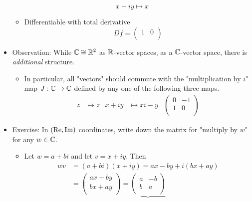\documentclass[../notes.tex]{subfiles}
\begin{document}
\begin{itemize}
\begin{equation*}
        x+iy \mapsto x
    \end{equation*}
    \begin{itemize}
        \item Differentiable with total derivative
        \begin{equation*}
            Df =
            \begin{pmatrix}
                1 & 0\\
            \end{pmatrix}
        \end{equation*}
    \end{itemize}
    \item Observation: While $\mathbb{C}\cong\mathbb{R}^2$ as $\mathbb{R}$-vector spaces, as a $\mathbb{C}$-vector space, there is \emph{additional} structure.
    \begin{itemize}
        \item In particular, all "vectors" should commute with the "multiplication by $i$" map $J:\mathbb{C}\to\mathbb{C}$ defined by any one of the following three maps.
        \begin{align*}
            z &\mapsto z&
            x+iy &\mapsto xi-y&
            \begin{pmatrix}
                0 & -1\\
                1 & 0\\
            \end{pmatrix}
        \end{align*}
    \end{itemize}
    \item Exercise: In $(\operatorname{Re},\operatorname{Im})$ coordinates, write down the matrix for "multiply by $w$" for any $w\in\mathbb{C}$.
    \begin{itemize}
        \item Let $w=a+bi$ and let $v=x+iy$. Then
        \begin{align*}
            wv &= (a+bi)(x+iy)
                = ax-by+i(bx+ay)\\
            &=
            \begin{pmatrix}
                ax-by\\
                bx+ay\\
            \end{pmatrix}
                = \underbrace{
                    \begin{pmatrix}
                        a & -b\\
                        b & a\\
                    \end{pmatrix}
}
\end{align*}
\end{itemize}
\end{itemize}
\end{document}
